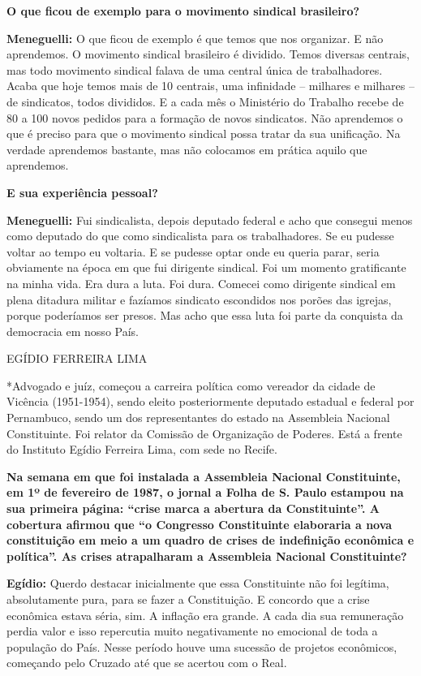 \textbf{O que ficou de exemplo para o movimento sindical brasileiro?}

\textbf{Meneguelli:} O que ficou de exemplo é que temos que nos
organizar. E não aprendemos. O movimento sindical brasileiro é dividido.
Temos diversas centrais, mas todo movimento sindical falava de uma
central única de trabalhadores. Acaba que hoje temos mais de 10
centrais, uma infinidade -- milhares e milhares -- de sindicatos, todos
divididos. E a cada mês o Ministério do Trabalho recebe de 80 a 100
novos pedidos para a formação de novos sindicatos. Não aprendemos o que
é preciso para que o movimento sindical possa tratar da sua unificação.
Na verdade aprendemos bastante, mas não colocamos em prática aquilo que
aprendemos.

\textbf{E sua experiência pessoal?}

\textbf{Meneguelli:} Fui sindicalista, depois deputado federal e acho
que consegui menos como deputado do que como sindicalista para os
trabalhadores. Se eu pudesse voltar ao tempo eu voltaria. E se pudesse
optar onde eu queria parar, seria obviamente na época em que fui
dirigente sindical. Foi um momento gratificante na minha vida. Era dura
a luta. Foi dura. Comecei como dirigente sindical em plena ditadura
militar e fazíamos sindicato escondidos nos porões das igrejas, porque
poderíamos ser presos. Mas acho que essa luta foi parte da conquista da
democracia em nosso País.

EGÍDIO FERREIRA LIMA

*Advogado e juíz, começou a carreira política como vereador da cidade de
Vicência (1951-1954), sendo eleito posteriormente deputado estadual e
federal por Pernambuco, sendo um dos representantes do estado na
Assembleia Nacional Constituinte. Foi relator da Comissão de Organização
de Poderes. Está a frente do Instituto Egídio Ferreira Lima, com sede no
Recife.

\textbf{Na semana em que foi instalada a Assembleia Nacional
Constituinte, em 1º de fevereiro de 1987, o jornal a Folha de S. Paulo
estampou na sua primeira página: ``crise marca a abertura da
Constituinte''. A cobertura afirmou que ``o Congresso Constituinte
elaboraria a nova constituição em meio a um quadro de crises de
indefinição econômica e política''. As crises atrapalharam a Assembleia
Nacional Constituinte?}

\textbf{Egídio:} Querdo destacar inicialmente que essa Constituinte não
foi legítima, absolutamente pura, para se fazer a Constituição. E
concordo que a crise econômica estava séria, sim. A inflação era grande.
A cada dia sua remuneração perdia valor e isso repercutia muito
negativamente no emocional de toda a população do País. Nesse período
houve uma sucessão de projetos econômicos, começando pelo Cruzado até
que se acertou com o Real.

